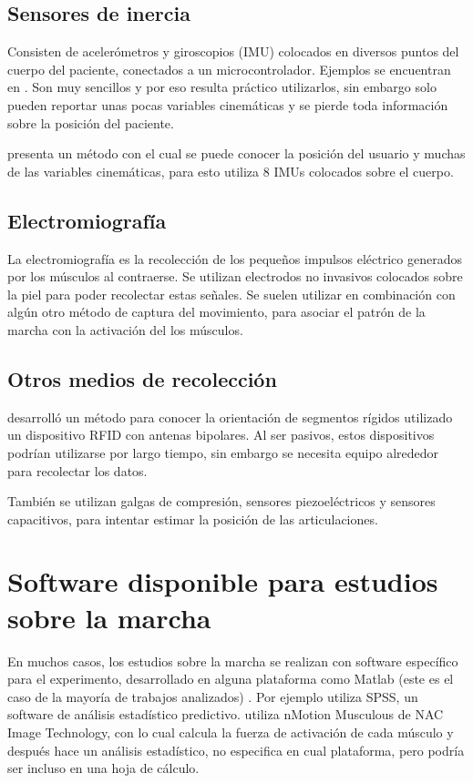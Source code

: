 \subsection{Sensores de inercia}

Consisten de acelerómetros y giroscopios (IMU) colocados en diversos puntos del cuerpo del paciente, conectados a un microcontrolador. Ejemplos se encuentran en \cite{menz, arif, senanayake, latt, mazza, hu}. Son muy sencillos y por eso resulta práctico utilizarlos, sin embargo solo pueden reportar unas pocas variables cinemáticas y se pierde toda información sobre la posición del paciente.

\cite{yuan} presenta un método con el cual se puede conocer la posición del usuario y muchas de las variables cinemáticas, para esto utiliza 8 IMUs colocados sobre el cuerpo.

\subsection{Electromiografía}

La electromiografía es la recolección de los pequeños impulsos eléctrico generados por los músculos al contraerse. Se utilizan electrodos no invasivos colocados sobre la piel para poder recolectar estas señales. Se suelen utilizar en combinación con algún otro método de captura del movimiento, para asociar el patrón de la marcha con la activación del los músculos. \citep{muro}

\subsection{Otros medios de recolección}

\cite{krigslund} desarrolló un método para conocer la orientación de segmentos rígidos utilizado un dispositivo RFID con antenas bipolares. Al ser pasivos, estos dispositivos podrían utilizarse por largo tiempo, sin embargo se necesita equipo alrededor para recolectar los datos. 

También se utilizan galgas de compresión, sensores piezoeléctricos y sensores capacitivos, para intentar estimar la posición de las articulaciones. \citep{muro}


\section[Software disponible]{Software disponible para estudios sobre la marcha}

En muchos casos, los estudios sobre la marcha se realizan con software específico para el experimento, desarrollado en alguna plataforma como Matlab (este es el caso de la mayoría de trabajos analizados) \citep{cuaya, mrozowski, eskinazi, senanayake, prakash, punt, menguc, bruijn}. Por ejemplo \cite{menz} utiliza SPSS, un software de análisis estadístico predictivo. \cite{mizoguchi} utiliza nMotion Musculous de NAC Image Technology, con lo cual calcula la fuerza de activación de cada músculo y después hace un análisis estadístico, no especifica en cual plataforma, pero podría ser incluso en una hoja de cálculo. 

